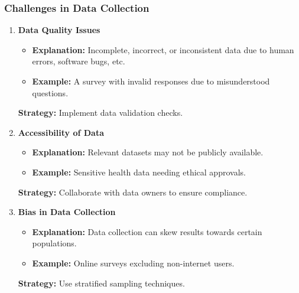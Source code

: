 \documentclass[aspectratio=169]{beamer}
\begin{document}
\begin{frame}[fragile]
    \frametitle{Challenges in Data Collection}
    \begin{enumerate}
        \item \textbf{Data Quality Issues}
            \begin{itemize}
                \item \textbf{Explanation:} Incomplete, incorrect, or inconsistent data due to human errors, software bugs, etc.
                \item \textbf{Example:} A survey with invalid responses due to misunderstood questions.
            \end{itemize}
            \textbf{Strategy:} Implement data validation checks.
        \item \textbf{Accessibility of Data}
            \begin{itemize}
                \item \textbf{Explanation:} Relevant datasets may not be publicly available.
                \item \textbf{Example:} Sensitive health data needing ethical approvals.
            \end{itemize}
            \textbf{Strategy:} Collaborate with data owners to ensure compliance.
        \item \textbf{Bias in Data Collection}
            \begin{itemize}
                \item \textbf{Explanation:} Data collection can skew results towards certain populations.
                \item \textbf{Example:} Online surveys excluding non-internet users.
            \end{itemize}
            \textbf{Strategy:} Use stratified sampling techniques.
    \end{enumerate}
\end{frame}
\end{document}
